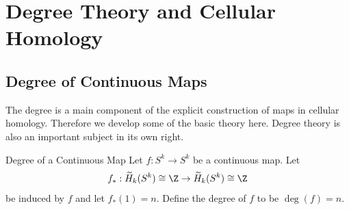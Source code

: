 \documentclass[a4paper]{article}
\begin{document}
\section{Degree Theory and Cellular Homology}
\subsection{Degree of Continuous Maps}
The degree is a main component of the explicit construction of maps in cellular homology. Therefore we develop some of the basic theory here. Degree theory is also an important subject in its own right. 

\begin{defn}{Degree of a Continuous Map}{} Let $f:S^k\to S^k$ be a continuous map. Let $$f_\ast:\widetilde{H}_k(S^k)\cong\Z\to\widetilde{H}_k(S^k)\cong\Z$$ be induced by $f$ and let $f_\ast(1)=n$. Define the degree of $f$ to be $\deg(f)=n$. 
\end{defn}
\end{document}

